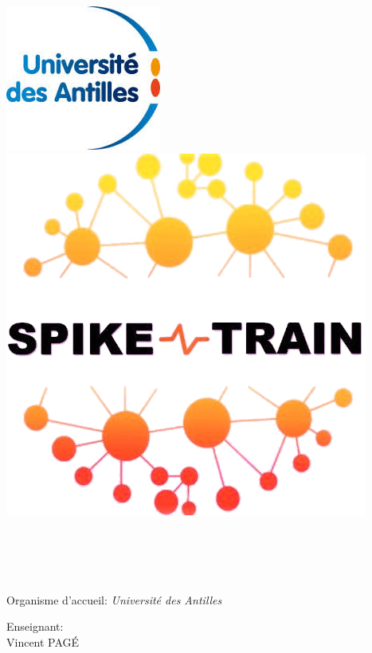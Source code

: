 \begin{titlepage}
	\begin{center}
		\includegraphics[scale=1.80]{../images/iconUA.png}
		\hspace{2cm}
		\includegraphics[scale=0.25]{../images/iconSpike.png} \\[2cm]
		\hspace{2.5cm}

		\HRule \\[0.4cm]
		\@title \\[0.4cm]
		\HRule \\[1cm]

		\@author \\ [1.5cm]

		{\large Organisme d'accueil: \textsl{Université des Antilles}} \\[1.5cm]

		\begin{minipage}{0.7\textwidth}
			\begin{center}
				Enseignant: \\
				\hspace{0.2cm} Vincent \textsc{PAG\'E}
			\end{center}
		\end{minipage}\\[3cm]

		\@date
	\end{center}
\end{titlepage}
